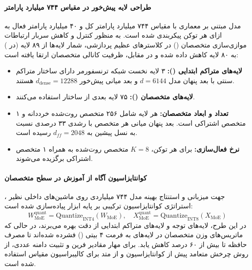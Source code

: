 \item {}

\paragraph*{طراحی لایه پیش‌خور در مقیاس ۷۴۴ میلیارد پارامتر}
مدل  \cite{glm5team2026} مبتنی بر معماری  با مقیاس ۷۴۴ میلیارد پارامتر کل و ۴۰ میلیارد پارامتر فعال به ازای هر توکن پیکربندی شده است. به منظور کنترل و کاهش سربار ارتباطات موازی‌سازی متخصصان () در کلاسترهای عظیم پردازشی، شمار لایه‌ها از ۸۹ لایه (در ) به ۸۰ لایه کاهش داده شده و در مقابل، ظرفیت کانالی متخصصان ارتقا یافته است:
\begin{itemize}
    \item \textbf{لایه‌های متراکم ابتدایی ():} ۳ لایه نخست شبکه ترنسفورمر دارای ساختار متراکم سنتی با بعد پنهان مدل $d = 6144$ و بعد میانی پیش‌خور $d_{\text{dense}} = 12288$ هستند.
    \item \textbf{لایه‌های متخصصان ():} ۷۵ لایه بعدی از ساختار  استفاده می‌کنند.
    \item \textbf{تعداد و ابعاد متخصصان:} هر لایه شامل ۲۵۶ متخصص روت‌شده خرددانه و ۱ متخصص اشتراکی است. بعد پنهان میانی هر متخصص با رشدی ۳۳ درصدی نسبت به نسل پیشین به $d_{ff} = 2048$ رسیده است.
    \item \textbf{نرخ فعال‌سازی:} برای هر توکن، $K = 8$ متخصص روت‌شده به همراه ۱ متخصص اشتراکی برگزیده می‌شوند.
\end{itemize}

\paragraph*{کوانتایزاسیون آگاه از آموزش  در سطح متخصصان}
جهت میزبانی و استنتاج بهینه مدل ۷۴۴ میلیاردی روی ماشین‌های داخلی نظیر ، استراتژی کوانتایزاسیون ترکیبی  بر پایه ابزار  پیاده‌سازی شده است:
\begin{equation}
    W_{\text{MoE}}^{\text{quant}} = \text{Quantize}_{\text{INT4}}(W_{\text{MoE}}), \quad X_{\text{MoE}}^{\text{quant}} = \text{Quantize}_{\text{INT8}}(X_{\text{MoE}})
\end{equation}
در این طرح، لایه‌های توجه و لایه‌های متراکم ابتدایی از دقت  بهره می‌برند، در حالی که ماتریس‌های وزن متخصصان در لایه‌های  به فرمت ۴ بیتی () فشرده شده‌اند تا مصرف حافظه  تا بیش از ۶۰ درصد کاهش یابد. برای مهار مقادیر فرین و تثبیت دامنه عددی، از روش چرخش متعامد  \cite{ashkboos2024quarot} پیش از کوانتایزاسیون و از متد  برای کالیبراسیون مقیاس استفاده شده است.

